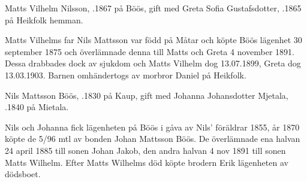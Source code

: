 Matts Vilhelm Nilsson, .1867 på Böös, gift med Greta Sofia Gustafsdotter, .1865 på Heikfolk hemman.
\begin{jhchildren}
  \item {}
  \item {}
  \item {}
  \item {}
\end{jhchildren}
Matts Vilhelms far Nils Mattsson var född på Måtar och köpte Böös lägenhet 30 september 1875 och överlämnade denna till Matts och Greta 4 november 1891. Dessa drabbades dock av sjukdom och Matts Vilhelm dog 13.07.1899, Greta dog 13.03.1903. Barnen omhändertogs av morbror Daniel på Heikfolk.


Nils Mattsson Böös, .1830 på Kaup, gift med  Johanna Johansdotter Mjetala, .1840 på Mietala.
\begin{jhchildren}
  \item {}
  \item {}
  \item {}
  \item {}
  \item {}
  \item {}
  \item {}
  \item {}
  \item {}
  \item {}
  \item {}
  \item {}
\end{jhchildren}
Nils och Johanna fick lägenheten på Böös i gåva av Nils' föräldrar 1855, år 1870 köpte de 5/96 mtl av bonden Johan Mattsson Böös. De överlämnade ena halvan 24 april 1885 till sonen Johan Jakob, den andra halvan 4 nov 1891 till sonen Matts Wilhelm. Efter Matts 				Wilhelms död köpte brodern Erik lägenheten av dödsboet.

